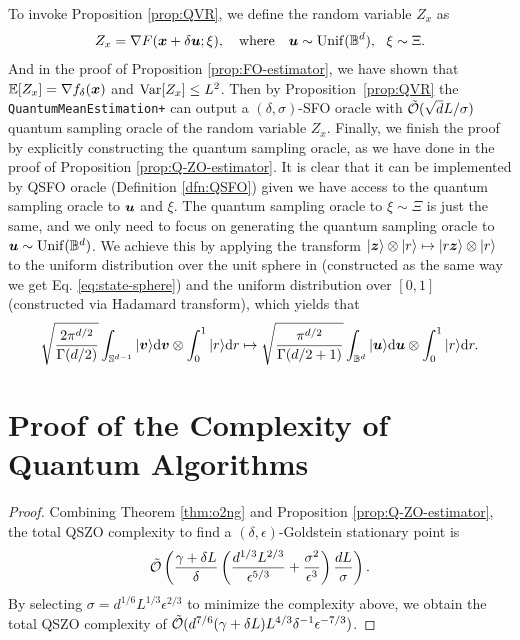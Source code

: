
\propqfoest*
To invoke Proposition \ref{prop:QVR}, we define the random variable $Z_x$ as
\begin{align*}
	Z_x = \nabla F ({\bm{x}}+ \delta {\bm{u}}; \xi), \quad {\rm where} \quad {\bm{u}} \sim {\rm Unif}({\mathbb{B}}^d), ~~ \xi \sim \Xi.
\end{align*}
And in the proof of Proposition \ref{prop:FO-estimator}, we have shown that $ \mathbb{E}[Z_x] = \nabla f_{\delta}({\bm{x}})$ and ${\rm Var}[Z_x] \le L^2$. 
Then by Proposition~\ref{prop:QVR} the \texttt{QuantumMeanEstimation+} can output a $(\delta,\sigma)$-SFO oracle with $\tilde {{\mathcal{O}}}( \sqrt{d} L / \sigma)$ quantum sampling oracle of the random variable $Z_x$. Finally, we finish the proof by explicitly constructing the quantum sampling oracle, as we have done in the proof of Proposition \ref{prop:Q-ZO-estimator}. It is clear that it can be implemented by QSFO oracle (Definition \ref{dfn:QSFO}) given we have access to the quantum sampling oracle to ${\bm{u}}$ and $\xi$. The quantum sampling oracle to $\xi \sim \Xi$ is just the same, and we only need to focus on generating the quantum sampling oracle to ${\bm{u}} \sim {\rm Unif}({\mathbb{B}}^d)$. We achieve this by
applying the transform $| {\bm{z}} \rangle \otimes | r \rangle \mapsto | r {\bm{z}} \rangle \otimes | r \rangle $ to the uniform distribution over the unit sphere in (constructed as the same way we get Eq. \ref{eq:state-sphere}) and the uniform distribution over $[0,1]$ (constructed via Hadamard transform), which yields that
\begin{align*}
	\sqrt{ \frac{2 \pi^{d/2}}{\Gamma(d/2)} }\int_{{\mathbb{S}}^{d-1}} | {\bm{v}} \rangle {\rm d} {\bm{v}} \otimes \int_{0}^1 | r \rangle {\rm d} r \mapsto \sqrt{\frac{\pi^{d/2}}{\Gamma(d/2+1)}} \int_{{\mathbb{B}}^d} | {\bm{u}} \rangle {\rm d} {\bm{u}} \otimes \int_{0}^1 | r \rangle {\rm d} r.
\end{align*}

\section{Proof of the Complexity of Quantum Algorithms}\label{app:proof-quantum-complexity}

\thmQZO*
\begin{proof}
	Combining Theorem \ref{thm:o2ng} and Proposition \ref{prop:Q-ZO-estimator}, the total QSZO complexity to find a $(\delta,\epsilon)$-Goldstein stationary point is
	\begin{align*}
		\tilde {{\mathcal{O}}} \left( \frac{\gamma + \delta L}{\delta}  \left( \frac{ d^{1/3} L^{2/3}}{\epsilon^{5/3}} + \frac{\sigma^2}{\epsilon^3} \right) \frac{dL}{\sigma}  \right).
	\end{align*}
	By selecting $\sigma= d^{1/6} L^{1/3} \epsilon^{2/3} $ to minimize the complexity above, we obtain the total QSZO complexity of $\tilde {{\mathcal{O}}}(d^{7/6}(\gamma + \delta L) L^{4/3} \delta^{-1} \epsilon^{-7/3})$.
\end{proof}

